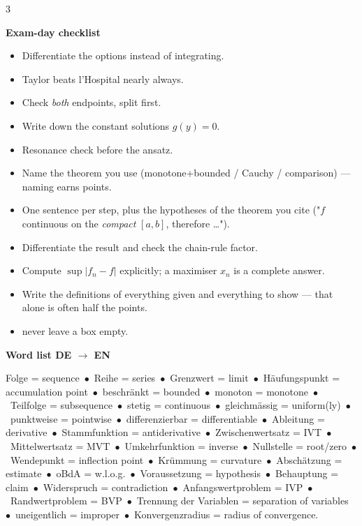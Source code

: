 \begin{multicols}{3}
{\columnbreak

\textbf{\sffamily\color{subText}Exam-day checklist}\par\nobreak\vspace{1pt}
\begin{itemize}[noitemsep,topsep=1pt,leftmargin=*]
\item {} Differentiate the options instead of integrating.
\item {} Taylor beats l'Hospital nearly always.
\item {} Check \emph{both} endpoints, split first.
\item {} Write down the constant solutions $g(y)=0$.
\item {} Resonance check before the ansatz.
\item {} Name the theorem you use (monotone+bounded / Cauchy / comparison) --- naming earns points.
\item {} One sentence per step, plus the hypotheses of the theorem you cite ("$f$ continuous on the \emph{compact} $[a,b]$, therefore \dots").
\item {} Differentiate the result and check the chain-rule factor.
\item {} Compute $\sup|f_n-f|$ explicitly; a maximiser $x_n$ is a complete answer.
\item {} Write the definitions of everything given and everything to show --- that alone is often half the points.
\item {} never leave a box empty.
\end{itemize}

\vspace{2pt}
\textbf{\sffamily\color{subText}Word list DE $\to$ EN}\par\nobreak\vspace{1pt}
{\raggedright
Folge = sequence\ $\bullet$\ Reihe = series\ $\bullet$\ Grenzwert = limit\ $\bullet$\ H\"aufungspunkt = accumulation point\ $\bullet$\ beschr\"ankt = bounded\ $\bullet$\ monoton = monotone\ $\bullet$\ Teilfolge = subsequence\ $\bullet$\ stetig = continuous\ $\bullet$\ gleichm\"assig = uniform(ly)\ $\bullet$\ punktweise = pointwise\ $\bullet$\ differenzierbar = differentiable\ $\bullet$\ Ableitung = derivative\ $\bullet$\ Stammfunktion = antiderivative\ $\bullet$\ Zwischenwertsatz = IVT\ $\bullet$\ Mittelwertsatz = MVT\ $\bullet$\ Umkehrfunktion = inverse\ $\bullet$\ Nullstelle = root/zero\ $\bullet$\ Wendepunkt = inflection point\ $\bullet$\ Kr\"ummung = curvature\ $\bullet$\ Absch\"atzung = estimate\ $\bullet$\ oBdA = w.l.o.g.\ $\bullet$\ Voraussetzung = hypothesis\ $\bullet$\ Behauptung = claim\ $\bullet$\ Widerspruch = contradiction\ $\bullet$\ Anfangswertproblem = IVP\ $\bullet$\ Randwertproblem = BVP\ $\bullet$\ Trennung der Variablen = separation of variables\ $\bullet$\ uneigentlich = improper\ $\bullet$\ Konvergenzradius = radius of convergence.
\par}
}
\end{multicols}

